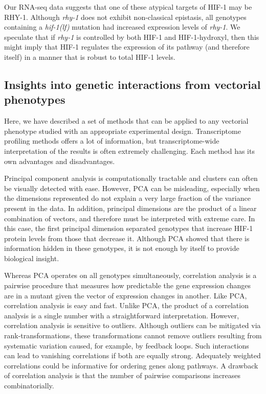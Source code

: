 \documentclass[9pt,twocolumn,twoside]{pnas-new}
\newcommand{\gene}[1]{\mbox{\emph{#1}}}
\newcommand{\hif}{\gene{hif-1(lf)}}
\newcommand{\rhyp}{RHY-1}
\newcommand{\hifp}{HIF-1}
\begin{document}
Our RNA-seq data suggests that one of these atypical targets of \hifp{} may be
\rhyp{}. Although \gene{rhy-1} does not exhibit non-classical epistasis, all
genotypes containing a \hif{} mutation had increased expression levels of
\gene{rhy-1}. We speculate that if \gene{rhy-1} is controlled by both \hifp{}
and \hifp{}-hydroxyl, then this might imply that \hifp{} regulates the
expression of its pathway (and therefore itself) in a manner that is robust to
total \hifp{} levels.

\subsection*{Insights into genetic interactions from vectorial phenotypes}
Here, we have described a set of methods that can be  applied to any vectorial
phenotype studied with an appropriate experimental design. Transcriptome
profiling methods offers a lot of information, but transcriptome-wide
interpretation of the results is often extremely challenging. Each method has
its own advantages and disadvantages.

Principal component analysis is computationally tractable and clusters can often
be visually detected with ease. However, PCA can be misleading, especially when
the dimensions represented do not explain a very large fraction of the variance
present in the data. In addition, principal dimensions are the product of a
linear combination of vectors, and therefore must be interpreted with extreme
care. In this case, the first principal dimension separated genotypes that
increase \hifp{} protein levels from those that decrease it. Although PCA showed
that there is information hidden in these genotypes, it is not enough by itself
to provide biological insight.

Whereas PCA operates on all genotypes simultaneously, correlation analysis is a
pairwise procedure that measures how predictable the gene expression changes are
in a mutant given the vector of expression changes in another. Like PCA,
correlation analysis is easy and fast. Unlike PCA, the product of a correlation
analysis is a single number with a straightforward interpretation. However,
correlation analysis is sensitive to outliers. Although outliers can be
mitigated via rank-transformations, these transformations cannot remove outliers
resulting from systematic variation caused, for example, by feedback loops. Such
interactions can lead to vanishing correlations if both are equally strong.
Adequately weighted correlations could be informative for ordering genes along
pathways. A drawback of correlation analysis is that the number of pairwise
comparisons increases combinatorially.
\end{document}
